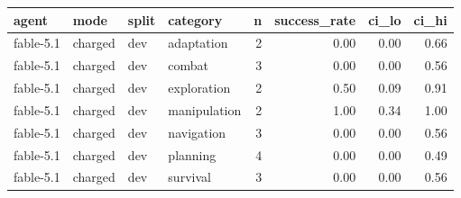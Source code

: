 \begin{tabular}{llllrrrr}
\toprule
agent & mode & split & category & n & success\_rate & ci\_lo & ci\_hi \\
\midrule
fable-5.1 & charged & dev & adaptation & 2 & 0.00 & 0.00 & 0.66 \\
fable-5.1 & charged & dev & combat & 3 & 0.00 & 0.00 & 0.56 \\
fable-5.1 & charged & dev & exploration & 2 & 0.50 & 0.09 & 0.91 \\
fable-5.1 & charged & dev & manipulation & 2 & 1.00 & 0.34 & 1.00 \\
fable-5.1 & charged & dev & navigation & 3 & 0.00 & 0.00 & 0.56 \\
fable-5.1 & charged & dev & planning & 4 & 0.00 & 0.00 & 0.49 \\
fable-5.1 & charged & dev & survival & 3 & 0.00 & 0.00 & 0.56 \\
\bottomrule
\end{tabular}
